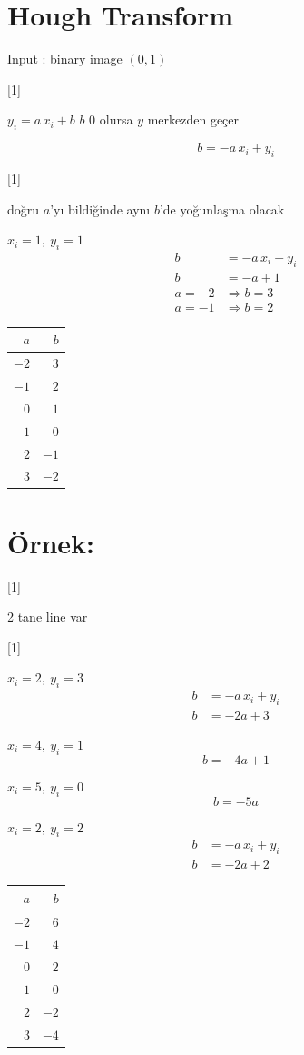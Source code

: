 \documentclass[11pt,a4paper]{article}
\begin{document}

\section{Hough Transform}
Input : binary image $(0,1)$ 

[1]

$y_i=a\,x_i+b$ \hfill $b$ 0 olursa $y$ merkezden geçer

\[ b=-a\,x_i+y_i \]

[1]

doğru $a$'yı bildiğinde aynı $b$'de yoğunlaşma olacak

$x_i=1,\ y_i=1$
\begin{align*}
b&=-a\,x_i+y_i\\
b&=-a+1\\
a=-2&\Rightarrow b=3\\
a=-1&\Rightarrow b=2
\end{align*}
\begin{center}
\begin{tabular}{r|r}
$a$ & $b$\\\hline
$-2$ & $3$\\
$-1$ & $2$\\
$0$ & $1$\\
$1$ & $0$\\
$2$ & $-1$\\
$3$ & $-2$
\end{tabular}
\end{center}

\section{Örnek:}
[1]

2 tane line var

[1]

{\color{murekkep}
$x_i=2,\ y_i=3$
\begin{align*}
b&=-a\,x_i+y_i\\
b&=-2a+3
\end{align*}}

{\color{yesilkalem}
$x_i=4,\ y_i=1$
\[ b=-4a+1 \]}

$x_i=5,\ y_i=0$
\[ b=-5a \]

{\color{turuncukalem}
$x_i=2,\ y_i=2$
\begin{align*}
b&=-a\,x_i+y_i\\
b&=-2a+2
\end{align*}
\begin{tabular}{r|r}
$a$ & $b$\\\hline
$-2$ & $6$\\
$-1$ & $4$\\
$0$ & $2$\\
$1$ & $0$\\
$2$ & $-2$\\
$3$ & $-4$
\end{tabular}}
\end{document}
